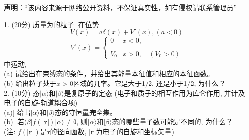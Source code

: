 
\textbf{声明}：“该内容来源于网络公开资料，不保证真实性，如有侵权请联系管理员”

1. (20分) 质量为的粒子, 在位势
$$V(x) = a \delta (x) + V'(x), (a < 0)~$$
$$V'(x) = \begin{cases} 0 & x < 0, \\\\ V_0 & x > 0,\quad (V_0 > 0)\end{cases}~$$
中运动,\\
(a) 试给出在束缚态的条件，并给出其能量本征值和相应的本征函数。\\
(b) 给出粒子处于$ x > 0 $区域的几率。它是大于1/2, 还是小于1/2, 为什么？\\

2. (10分) 态$|\alpha\rangle$和$|\beta\rangle$是复原子的定态 (电子和质子的相互作用为库仑作用, 并计及电子的自旋-轨道耦合项)\\
(a)] 给出$|\alpha\rangle$和$|\beta\rangle$态的守恒量完全集。\\
(b)] 若$\langle \beta|f(|\mathbf{r}|) |\alpha\rangle \neq 0$, 则$|\alpha\rangle$和$|\beta\rangle$态的哪些量子数可能是不同的, 为什么？\\
(注: $f(|\mathbf{r}|)$是$\mathbf{r}$的径向函数, $|\mathbf{r}|$为电子的自旋和坐标矢量)\\
